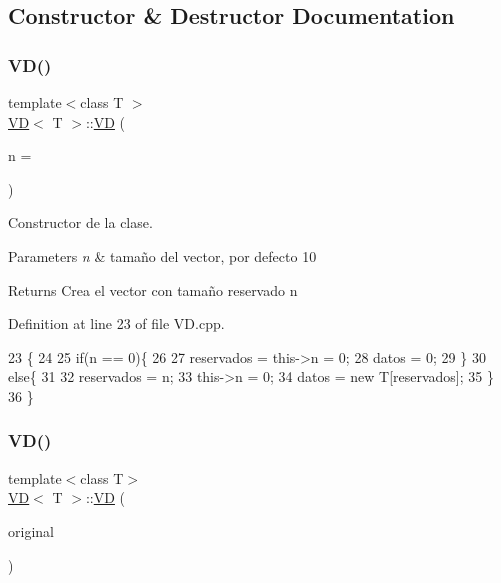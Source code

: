 \subsection{Constructor \& Destructor Documentation}
\mbox{\label{classVD_a080ac98ef3d7377f287556c21637a073}} 
\subsubsection{\texorpdfstring{V\+D()}{VD()}\hspace{0.1cm}{\footnotesize\ttfamily [1/2]}}
{\footnotesize\ttfamily template$<$class T $>$ \\
\hyperlink{classVD}{VD}$<$ T $>$\+::\hyperlink{classVD}{VD} (\begin{DoxyParamCaption}\item[{int}]{n = {} }\end{DoxyParamCaption})}



Constructor de la clase. 


\begin{DoxyParams}{Parameters}
{\em n} & tamaño del vector, por defecto 10 \\
\hline
\end{DoxyParams}
\begin{DoxyReturn}{Returns}
Crea el vector con tamaño reservado n 
\end{DoxyReturn}


Definition at line 23 of file V\+D.\+cpp.


\begin{DoxyCode}
23               \{
24 
25     \textcolor{keywordflow}{if}(n == 0)\{
26 
27         reservados = this->n = 0;
28         datos = 0;
29     \}
30     \textcolor{keywordflow}{else}\{
31 
32         reservados = n;
33         this->n = 0;
34         datos = \textcolor{keyword}{new} T[reservados];
35     \}
36 \}
\end{DoxyCode}
\mbox{\label{classVD_a4f22b92dd8ace25d50311ccd61508dfc}} 
\subsubsection{\texorpdfstring{V\+D()}{VD()}\hspace{0.1cm}{\footnotesize\ttfamily [2/2]}}
{\footnotesize\ttfamily template$<$class T$>$ \\
\hyperlink{classVD}{VD}$<$ T $>$\+::\hyperlink{classVD}{VD} (\begin{DoxyParamCaption}\item[{const \hyperlink{classVD}{VD}$<$ T $>$ \&}]{original }\end{DoxyParamCaption})}



